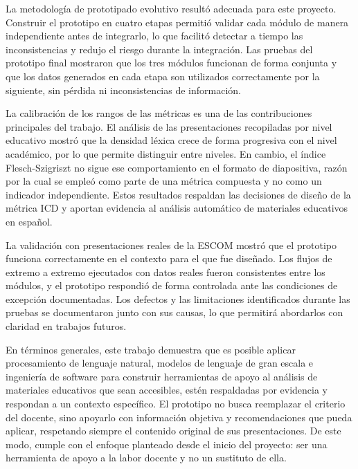 \documentclass[11pt]{article}
\begin{document}
La metodología de prototipado evolutivo resultó adecuada para este proyecto. Construir el prototipo en cuatro etapas permitió validar cada módulo de manera independiente antes de integrarlo, lo que facilitó detectar a tiempo las inconsistencias y redujo el riesgo durante la integración. Las pruebas del prototipo final mostraron que los tres módulos funcionan de forma conjunta y que los datos generados en cada etapa son utilizados correctamente por la siguiente, sin pérdida ni inconsistencias de información.

La calibración de los rangos de las métricas es una de las contribuciones principales del trabajo. El análisis de las presentaciones recopiladas por nivel educativo mostró que la densidad léxica crece de forma progresiva con el nivel académico, por lo que permite distinguir entre niveles. En cambio, el índice Flesch-Szigriszt no sigue ese comportamiento en el formato de diapositiva, razón por la cual se empleó como parte de una métrica compuesta y no como un indicador independiente. Estos resultados respaldan las decisiones de diseño de la métrica ICD y aportan evidencia al análisis automático de materiales educativos en español.

La validación con presentaciones reales de la ESCOM mostró que el prototipo funciona correctamente en el contexto para el que fue diseñado. Los flujos de extremo a extremo ejecutados con datos reales fueron consistentes entre los módulos, y el prototipo respondió de forma controlada ante las condiciones de excepción documentadas. Los defectos y las limitaciones identificados durante las pruebas se documentaron junto con sus causas, lo que permitirá abordarlos con claridad en trabajos futuros.

En términos generales, este trabajo demuestra que es posible aplicar procesamiento de lenguaje natural, modelos de lenguaje de gran escala e ingeniería de software para construir herramientas de apoyo al análisis de materiales educativos que sean accesibles, estén respaldadas por evidencia y respondan a un contexto específico. El prototipo no busca reemplazar el criterio del docente, sino apoyarlo con información objetiva y recomendaciones que pueda aplicar, respetando siempre el contenido original de sus presentaciones. De este modo, cumple con el enfoque planteado desde el inicio del proyecto: ser una herramienta de apoyo a la labor docente y no un sustituto de ella.
\clearpage
\end{document}
